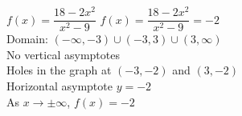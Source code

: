 {$f(x) = \dfrac{18-2x^2}{x^2-9}$}
{$f(x) = \dfrac{18-2x^2}{x^2-9} = -2$\\
Domain: $(-\infty, -3) \cup (-3,3) \cup (3, \infty)$\\
No vertical asymptotes \\
Holes in the graph at $(-3,-2)$ and $(3,-2)$ \\
Horizontal asymptote $y = -2$ \\
As $x \rightarrow \pm \infty$, $f(x) = -2$ }